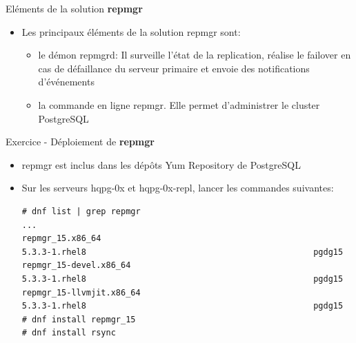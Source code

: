 
\begin{frame}[fragile]{Eléments de la solution \textbf{repmgr}}

   \begin{itemize}
      \item Les principaux éléments de la solution repmgr sont:
      \begin{itemize}
         \item le démon repmgrd: Il surveille l'état de la replication, réalise le failover en cas de défaillance du serveur primaire et envoie des notifications d'événements
         \item la commande en ligne repmgr. Elle permet d'administrer le cluster PostgreSQL
      \end{itemize}
   \end{itemize}

\end{frame}


\begin{frame}[fragile]{Exercice - Déploiement de \textbf{repmgr}}

   \begin{itemize}
      \item repmgr est inclus dans les dépôts Yum Repository de PostgreSQL
      \item Sur les serveurs hqpg-0x et hqpg-0x-repl, lancer les commandes suivantes:
\begin{tiny}
\begin{Verbatim}[commandchars=\\\{\}]
# dnf list | grep repmgr
...
repmgr_15.x86_64                                                  5.3.3-1.rhel8                                              pgdg15       
repmgr_15-devel.x86_64                                            5.3.3-1.rhel8                                              pgdg15       
repmgr_15-llvmjit.x86_64                                          5.3.3-1.rhel8                                              pgdg15
# dnf install repmgr_15
# dnf install rsync
\end{Verbatim}
\end{tiny}
   \end{itemize}

\end{frame}

